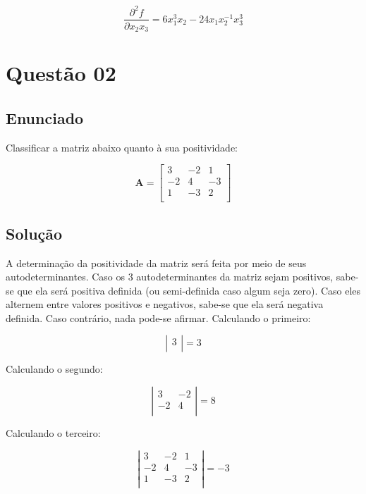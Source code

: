 \documentclass[10pt, a4paper]{article}
\begin{document}
\begin{equation}\label{q01:dx2x3}
    \frac{\partial^2 f}{\partial x_2x_3} = 6x_1^3x_2 - 24x_1x_2^{-1}x_3^3
\end{equation}



\section[q02]{Questão 02}

\subsection[q02:enunciado]{Enunciado}

Classificar a matriz abaixo quanto à sua positividade:

\[
  \mathbf{A} =
  \left[ {\begin{array}{ccc}
    3 & -2 & 1 \\
    -2 & 4 & -3 \\
    1 & -3 & 2 \\
  \end{array} } \right]
\]

\subsection[q02:solucao]{Solução}

A determinação da positividade da matriz será feita por meio de seus autodeterminantes. 
Caso os 3 autodeterminantes da matriz sejam positivos, sabe-se que ela será positiva definida (ou semi-definida caso algum seja zero). 
Caso eles alternem entre valores positivos e negativos, sabe-se que ela será negativa definida. Caso contrário,
nada pode-se afirmar. Calculando o primeiro:

\[
  \left| {\begin{array}{c}
    3\\
  \end{array} } \right| = 3
\]

Calculando o segundo:

\[
  \left| {\begin{array}{cc}
    3 & -2 \\
    -2 & 4 \\
  \end{array} } \right| = 8
\]

Calculando o terceiro:

\[
  \left| {\begin{array}{ccc}
    3 & -2 & 1 \\
    -2 & 4 & -3 \\
    1 & -3 & 2 \\
  \end{array} } \right| = -3
\]
\end{document}
